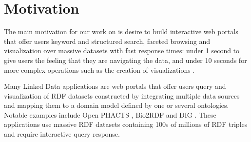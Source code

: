 \section{Motivation}
\label{sec:motivation}
The main motivation for our work on \ldviews is desire to build interactive web portals that offer users keyword and structured search, faceted browsing and visualization over massive datasets with fast response times:  under 1 second to give users the feeling that they are navigating the data, and under 10 seconds for more complex operations such as the creation of visualizations \cite{nielsen1994usability}.

Many Linked Data applications are web portals that offer users query and visualization of RDF datasets constructed by integrating multiple data sources and mapping them to a domain model defined by one or several ontologies.
Notable examples include Open PHACTS \cite{Groth_Loizou_Gray_Goble_Harland_Pettifer_2014}, Bio2RDF \cite{callahan2013bio2rdf} and DIG \cite{szekely2015building}.
These applications use massive RDF datasets containing 100s of millions of RDF triples and require interactive query response.